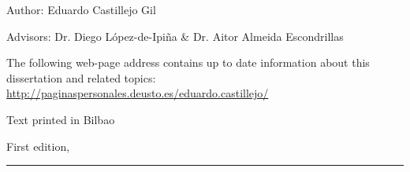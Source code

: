 
\thispagestyle{empty}

\hfill

\vfill

\medskip






Author: Eduardo Castillejo Gil

Advisors: Dr. Diego {López-de-Ipiña} \& Dr. Aitor Almeida Escondrillas



\vfill

\vfill

\noindent
The following web-page address contains up to date information about this 
dissertation and related topics: \\
\url{http://paginaspersonales.deusto.es/eduardo.castillejo/}


\noindent
Text printed in Bilbao

\noindent
First edition, 
\monthname \ \the\year

\vspace{1cm}
\hrule
\bigskip

\cleardoublepage

%
%
%
%
%
%

